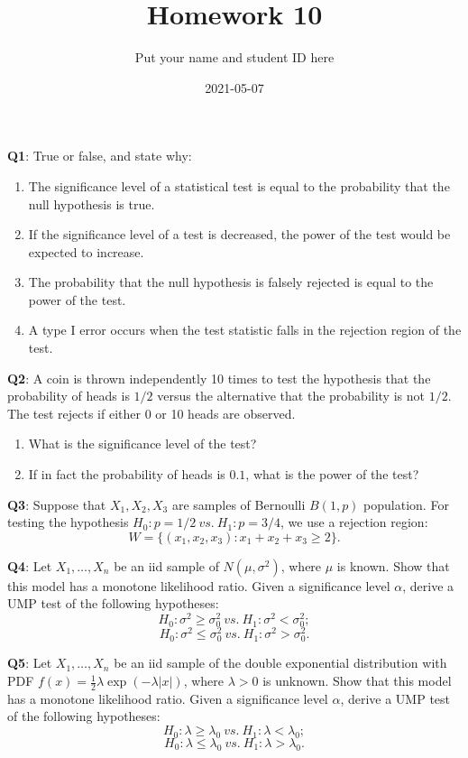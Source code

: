 \documentclass[]{article}
\title{Homework 10}
\author{Put your name and student ID here}
\date{2021-05-07}
\providecommand{\tightlist}{%
  \setlength{\itemsep}{0pt}\setlength{\parskip}{0pt}}
\begin{document}
\maketitle

\textbf{Q1}: True or false, and state why:

\begin{enumerate}
\def\labelenumi{\arabic{enumi}.}
\tightlist
\item
  The significance level of a statistical test is equal to the
  probability that the null hypothesis is true.
\item
  If the significance level of a test is decreased, the power of the
  test would be expected to increase.
\item
  The probability that the null hypothesis is falsely rejected is equal
  to the power of the test.
\item
  A type I error occurs when the test statistic falls in the rejection
  region of the test.
\end{enumerate}

\textbf{Q2}: A coin is thrown independently 10 times to test the
hypothesis that the probability of heads is \(1/2\) versus the
alternative that the probability is not \(1/2\). The test rejects if
either 0 or 10 heads are observed.

\begin{enumerate}
\def\labelenumi{\arabic{enumi}.}
\tightlist
\item
  What is the significance level of the test?
\item
  If in fact the probability of heads is \(0.1\), what is the power of
  the test?
\end{enumerate}

\textbf{Q3}: Suppose that \(X_1,X_2,X_3\) are samples of Bernoulli
\(B(1,p)\) population. For testing the hypothesis
\(H_0:p=1/2\ vs.\ H_1:p=3/4\), we use a rejection region:
\[W=\{(x_1,x_2,x_3):x_1+x_2+x_3\ge 2\}.\]

\textbf{Q4}: Let \(X_1,\dots,X_n\) be an iid sample of
\(N(\mu,\sigma^2)\), where \(\mu\) is known. Show that this model has a
monotone likelihood ratio. Given a significance level \(\alpha\), derive
a UMP test of the following hypotheses:
\[H_0:\sigma^2 \ge \sigma_0^2\ vs.\ H_1:\sigma^2<\sigma_0^2;\]
\[H_0:\sigma^2 \le \sigma_0^2\ vs.\ H_1:\sigma^2>\sigma_0^2.\]

\textbf{Q5}: Let \(X_1,\dots,X_n\) be an iid sample of the double
exponential distribution with PDF
\(f(x) = \frac 12\lambda\exp(-\lambda|x|)\), where \(\lambda>0\) is
unknown. Show that this model has a monotone likelihood ratio. Given a
significance level \(\alpha\), derive a UMP test of the following
hypotheses: \[H_0:\lambda \ge \lambda_0\ vs.\ H_1:\lambda < \lambda_0;\]
\[H_0:\lambda \le \lambda_0\ vs.\ H_1:\lambda > \lambda_0.\]
\end{document}
